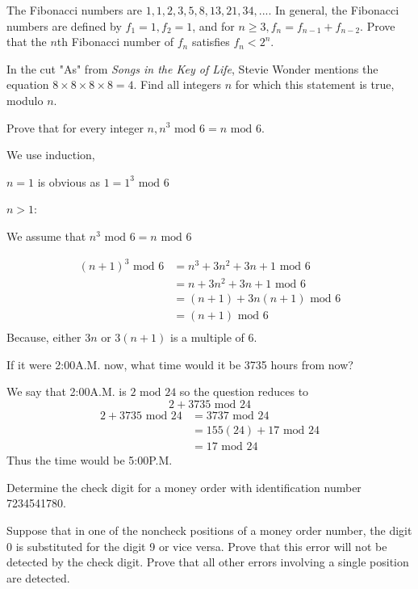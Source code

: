 \documentclass[11pt,largemargins]{homework}
\begin{document}
\question 
The Fibonacci numbers are $1,1,2,3,5,8,13,21,34,...$. In general, the Fibonacci numbers are defined by $f_1=1, f_2=1$, and for 
$n\geq3, f_n=f_{n-1}+f_{n-2}$. Prove that the $n$th Fibonacci number of $f_n$ satisfies $f_n<2^n$.

\question 
In the cut "As" from \textit{Songs in the Key of Life}, Stevie Wonder mentions the equation $8\times8\times8\times8=4$. Find 
all integers $n$ for which this statement is true, modulo $n$.

\question 
Prove that for every integer $n, n^3\text{ mod }6=n\text{ mod }6$.

\quad We use induction,

\quad $n=1$ is obvious as $1=1^3\text{ mod }6$

\quad $n>1$:

We assume that $n^3\text{ mod }6=n\text{ mod }6$

\begin{align*}
    (n+1)^3\text{ mod }6 &= n^3+3n^2+3n+1\text{ mod }6\\
                         &= n + 3n^2+3n+1\text{ mod }6\\
                         &= (n+1) + 3n(n+1)\text{ mod }6\\
                         &= (n+1)\text{ mod }6\\
\end{align*}
\quad Because, either $3n$ or $3(n+1)$ is a multiple of 6.


\question 
If it were 2:00A.M. now, what time would it be 3735 hours from now?

\quad We say that 2:00A.M. is $2\text{ mod }24$ so the question reduces to 
$$2+3735\text{ mod }24$$
\begin{align*}
    2+3735\text{ mod }24 &= 3737\text{ mod }24\\
                         &= 155(24) + 17 \text{ mod }24\\
                         &= 17 \text{ mod }24
\end{align*}
\quad Thus the time would be 5:00P.M.

\question 
Determine the check digit for a money order with identification number 7234541780.

\question 
Suppose that in one of the noncheck positions of a money order number, the digit 0 is substituted for the digit 9 or vice versa.
Prove that this error will not be detected by the check digit. Prove that all other errors involving a single position 
are detected.
\end{document}
